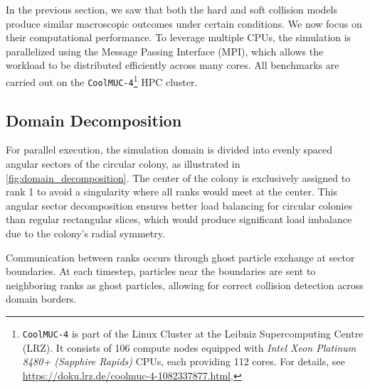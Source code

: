 \documentclass[conference]{IEEEtran}
\begin{document}
In the previous section, we saw that both the hard and soft collision models produce similar macroscopic outcomes under certain conditions. We now focus on their computational performance. To leverage multiple CPUs, the simulation is parallelized using the Message Passing Interface (MPI), which allows the workload to be distributed efficiently across many cores. All benchmarks are carried out on the \texttt{CoolMUC-4}\footnote{\texttt{CoolMUC-4} is part of the Linux Cluster at the Leibniz Supercomputing Centre (LRZ). It consists of 106 compute nodes equipped with \textit{Intel Xeon Platinum 8480+ (Sapphire Rapids)} CPUs, each providing 112 cores. For details, see \url{https://doku.lrz.de/coolmuc-4-1082337877.html}.}
HPC cluster.

\subsection{Domain Decomposition}

For parallel execution, the simulation domain is divided into evenly spaced angular sectors of the circular colony, as illustrated in \autoref{fig:domain_decomposition}. The center of the colony is exclusively assigned to rank 1 to avoid a singularity where all ranks would meet at the center. This angular sector decomposition ensures better load balancing for circular colonies than regular rectangular slices, which would produce significant load imbalance due to the colony's radial symmetry.

Communication between ranks occurs through ghost particle exchange at sector boundaries. At each timestep, particles near the boundaries are sent to neighboring ranks as ghost particles, allowing for correct collision detection across domain borders.
\end{document}
